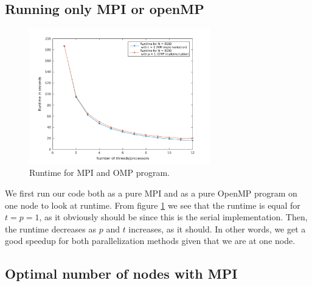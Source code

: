 \subsection*{Running only MPI or openMP}
\begin{figure}[h!]
			\centering
			\includegraphics[width=0.7\textwidth]{./figures/runtime_either_MPI_OMP}
			\caption{Runtime for MPI and OMP program.}
			\label{fig:MPIvsOMP}
\end{figure}
We first run our code both as a pure MPI and as a pure OpenMP program on one node to look at runtime. From figure \ref{fig:MPIvsOMP} we see that the runtime is equal for $t = p = 1$, as it obviously should be since this is the serial implementation. Then, the runtime decreases as $p$ and $t$ increases, as it should. In other words, we get a good speedup for both parallelization methods given that we are at one node. 


\subsection*{Optimal number of nodes with MPI}

